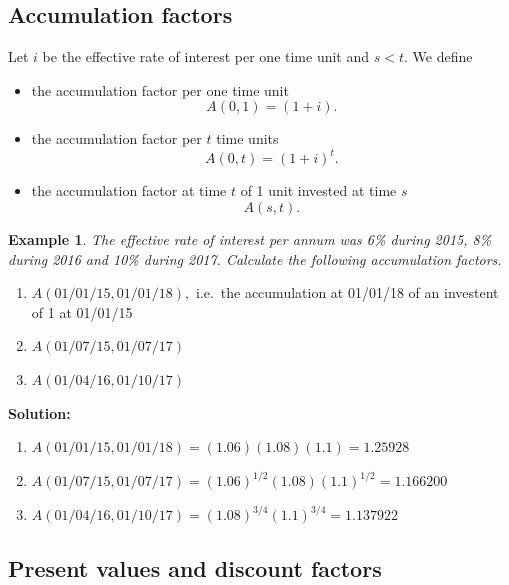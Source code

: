 \documentclass[
]{book}
\theoremstyle{definition}
\theoremstyle{definition}
\newtheorem{example}{Example}[chapter]
\theoremstyle{definition}
\theoremstyle{definition}
\theoremstyle{remark}
\begin{document}
\subsection{Accumulation factors}\label{accumulation-factors}

Let \(i\) be the effective rate of interest per one time unit and \(s < t\).
We define

\begin{itemize}
\item
  the accumulation factor per one time unit \[A(0,1) = (1 + i).\]
\item
  the accumulation factor per \(t\) time units \[A(0,t) = (1 + i)^t.\]
\item
  the accumulation factor at time \(t\) of 1 unit invested at time \(s\)
  \[A(s,t).\]
\end{itemize}

\begin{example}

\emph{The effective rate of interest per annum was 6\% during 2015, 8\% during
2016 and 10\% during 2017. Calculate the following accumulation factors.}

\begin{enumerate}
\def\labelenumi{\arabic{enumi}.}
\item
  \(A(01/01/15, 01/01/18),\) i.e.~the accumulation at 01/01/18 of an
  investent of 1 at 01/01/15
\item
  \(A(01/07/15, 01/07/17)\)
\item
  \(A(01/04/16, 01/10/17)\)
\end{enumerate}

\end{example}

\textbf{Solution:}

\begin{enumerate}
\def\labelenumi{\arabic{enumi}.}
\item
  \(A(01/01/15, 01/01/18) = (1.06)(1.08)(1.1) = 1.25928\)
\item
  \(A(01/07/15, 01/07/17) = (1.06)^{1/2}(1.08)(1.1)^{1/2} = 1.166200\)
\item
  \(A(01/04/16, 01/10/17) = (1.08)^{3/4}(1.1)^{3/4} = 1.137922\)
\end{enumerate}

\subsection{Present values and discount factors}\label{present-values-and-discount-factors}
\end{document}
